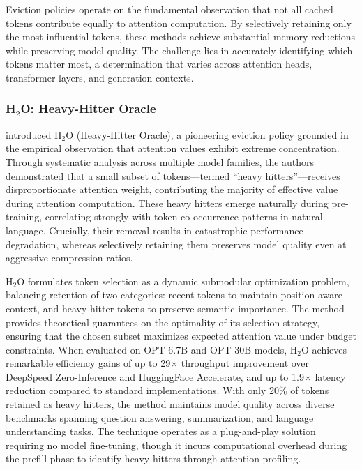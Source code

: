 Eviction policies operate on the fundamental observation that not all cached tokens contribute equally to attention computation. By selectively retaining only the most influential tokens, these methods achieve substantial memory reductions while preserving model quality. The challenge lies in accurately identifying which tokens matter most, a determination that varies across attention heads, transformer layers, and generation contexts.

\subsubsection{H$_2$O: Heavy-Hitter Oracle}

\citet{zhang2024h2o} introduced H$_2$O (Heavy-Hitter Oracle), a pioneering eviction policy grounded in the empirical observation that attention values exhibit extreme concentration. Through systematic analysis across multiple model families, the authors demonstrated that a small subset of tokens---termed ``heavy hitters''---receives disproportionate attention weight, contributing the majority of effective value during attention computation. These heavy hitters emerge naturally during pre-training, correlating strongly with token co-occurrence patterns in natural language. Crucially, their removal results in catastrophic performance degradation, whereas selectively retaining them preserves model quality even at aggressive compression ratios.

H$_2$O formulates token selection as a dynamic submodular optimization problem, balancing retention of two categories: recent tokens to maintain position-aware context, and heavy-hitter tokens to preserve semantic importance. The method provides theoretical guarantees on the optimality of its selection strategy, ensuring that the chosen subset maximizes expected attention value under budget constraints. When evaluated on OPT-6.7B and OPT-30B models, H$_2$O achieves remarkable efficiency gains of up to 29$\times$ throughput improvement over DeepSpeed Zero-Inference and HuggingFace Accelerate, and up to 1.9$\times$ latency reduction compared to standard implementations. With only 20\% of tokens retained as heavy hitters, the method maintains model quality across diverse benchmarks spanning question answering, summarization, and language understanding tasks. The technique operates as a plug-and-play solution requiring no model fine-tuning, though it incurs computational overhead during the prefill phase to identify heavy hitters through attention profiling.

